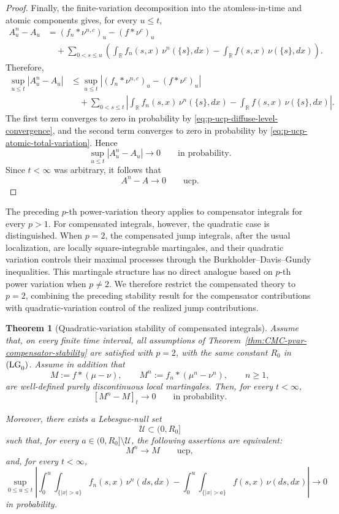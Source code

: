 \documentclass[a4paper,10pt]{article}
\newtheorem{thm}{Theorem}[section]
\begin{document}
\begin{proof}
Finally, the finite-variation decomposition into the
atomless-in-time and atomic components gives, for every \(u\le t\),
\[
\begin{aligned}
A^n_u-A_u
&=
(f_n*\nu^{n,c})_u-(f*\nu^c)_u
\\
&\quad+
\sum_{0<s\le u}
\left(
        \int_{\mathbb R}f_n(s,x)\,\nu^n(\{s\},dx)
        -
        \int_{\mathbb R}f(s,x)\,\nu(\{s\},dx)
\right).
\end{aligned}
\]
Therefore,
\[
\begin{aligned}
\sup_{u\le t}|A^n_u-A_u|
&\le
\sup_{u\le t}
\left|
(f_n*\nu^{n,c})_u-(f*\nu^c)_u
\right|
\\
&\quad+
\sum_{0<s\le t}
\left|
        \int_{\mathbb R}f_n(s,x)\,\nu^n(\{s\},dx)
        -
        \int_{\mathbb R}f(s,x)\,\nu(\{s\},dx)
\right|.
\end{aligned}
\]
The first term converges to zero in probability by
\eqref{eq:p-ucp-diffuse-level-convergence}, and the second term
converges to zero in probability by
\eqref{eq:p-ucp-atomic-total-variation}. Hence
\[
        \sup_{u\le t}|A^n_u-A_u|
        \longrightarrow0
        \qquad\text{in probability}.
\]
Since \(t<\infty\) was arbitrary, it follows that
\[
        A^n-A\longrightarrow0
        \qquad\text{ucp}.
\]
\end{proof}

The preceding \(p\)-th power-variation theory applies to compensator
integrals for every \(p>1\). For compensated integrals, however, the
quadratic case is distinguished. When \(p=2\), the compensated jump
integrals, after the usual localization, are locally square-integrable
martingales, and their quadratic variation controls their maximal
processes through the Burkholder--Davis--Gundy inequalities. This
martingale structure has no direct analogue based on \(p\)-th power
variation when \(p\ne2\). We therefore restrict the compensated theory
to \(p=2\), combining the preceding stability result for the
compensator contributions with quadratic-variation control of the
realized jump contributions.


\begin{thm}[Quadratic-variation stability of compensated integrals]
\label{thm:CMC-QV-compensated-stability}
Assume that, on every finite time interval, all assumptions of
Theorem~\ref{thm:CMC-pvar-compensator-stability} are satisfied with
\(p=2\), with the same constant \(R_0\) in \({\rm (LG}_0{\rm )}\).
Assume in addition that
\[
M:=f*(\mu-\nu),
\qquad
M^n:=f_n*(\mu^n-\nu^n),
\qquad n\ge1,
\]
are well-defined purely discontinuous local martingales. Then, for every
\(t<\infty\),
\[
        [M^n-M]_t\longrightarrow0
        \qquad\text{in probability}.
\]

Moreover, there exists a Lebesgue-null set
\[
        \mathcal U\subset(0,R_0]
\]
such that, for every \(a\in(0,R_0]\setminus\mathcal U\), the following
assertions are equivalent:
\[
        M^n\longrightarrow M
        \qquad\mathrm{ucp},
\]
and, for every \(t<\infty\),
\[
\sup_{0\le u\le t}
\left|
\int_0^u\int_{\{|x|>a\}}
f_n(s,x)\,\nu^n(ds,dx)
-
\int_0^u\int_{\{|x|>a\}}
f(s,x)\,\nu(ds,dx)
\right|
\longrightarrow0
\]
in probability.


\end{thm}
\end{document}
